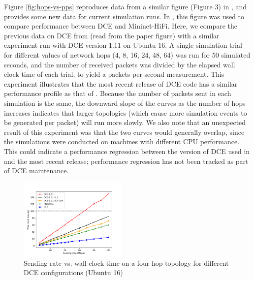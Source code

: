 \documentclass{sig-alternate}
\begin{document}
Figure \ref{fig:hops-vs-pps} reproduces data from a similar figure (Figure 3)
in \cite{Tazaki13}, and provides some new data for current simulation runs.
In \cite{Tazaki13}, this figure was used to compare performance between
DCE and Mininet-HiFi.  Here, we compare the previous data on DCE from
\cite{Tazaki13} (read from the paper figure) with a similar experiment run
with DCE version 1.11 on Ubuntu 16.  A single simulation trial for different
values of network hops (4, 8, 16, 24, 48, 64) was run for 50 simulated
seconds, and the number of received packets was divided by the elapsed
wall clock time of each trial, to yield a packets-per-second measurement.
This experiment illustrates that the most recent release of DCE code has a
similar performance profile as that of \cite{Tazaki13}.  Because the
number of packets sent in each simulation is the same, the downward
slope of the curves as the number of hops increases indicates that larger
topologies (which cause more simulation events to be generated per packet)
will run more slowly.  We also note that an unexpected result of this
experiment was that the two curves would generally overlap, since the
simulations were conducted on machines with different CPU performance.
This could indicate a performance regression between the version of DCE
used in \cite{Tazaki13} and the most recent release; performance regression
has not been tracked as part of DCE maintenance.

\begin{figure}[h!]
  \centering
    \includegraphics[width=0.47\textwidth]{figs/rate-vs-time.png}
  \caption{Sending rate vs. wall clock time on a four hop topology for different DCE configurations (Ubuntu 16)}
  \label{fig:rate-vs-time}
\end{figure}
\end{document}
